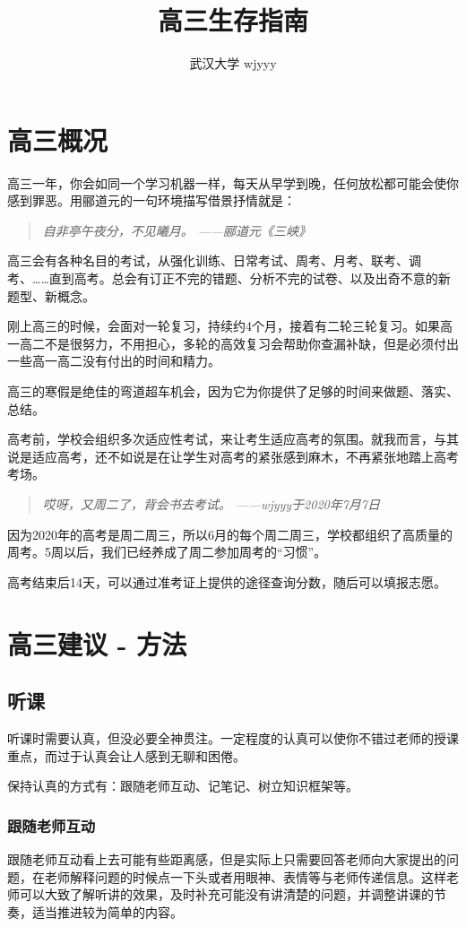 \documentclass[UTF8,11pt,a4paper]{ctexart}
\title{\textbf{高三生存指南}}
\author{武汉大学 wjyyy}
\begin{document}
	\maketitle
	\tableofcontents
	\section{高三概况}
		高三一年，你会如同一个学习机器一样，每天从早学到晚，任何放松都可能会使你感到罪恶。用郦道元的一句环境描写借景抒情就是：
		\begin{quote}
			\textit{自非亭午夜分，不见曦月。}
			\flushright\textit{——郦道元《三峡》}
		\end{quote}
		
		高三会有各种名目的考试，从强化训练、日常考试、周考、月考、联考、调考、……直到高考。总会有订正不完的错题、分析不完的试卷、以及出奇不意的新题型、新概念。
		
		刚上高三的时候，会面对一轮复习，持续约4个月，接着有二轮三轮复习。如果高一高二不是很努力，不用担心，多轮的高效复习会帮助你查漏补缺，但是必须付出一些高一高二没有付出的时间和精力。
		
		高三的寒假是绝佳的弯道超车机会，因为它为你提供了足够的时间来做题、落实、总结。
		
		高考前，学校会组织多次适应性考试，来让考生适应高考的氛围。就我而言，与其说是适应高考，还不如说是在让学生对高考的紧张感到麻木，不再紧张地踏上高考考场。
		
		\begin{quote}
			\textit{哎呀，又周二了，背会书去考试。}
			\flushright\textit{——wjyyy于2020年7月7日}
		\end{quote}
	
		因为2020年的高考是周二周三，所以6月的每个周二周三，学校都组织了高质量的周考。5周以后，我们已经养成了周二参加周考的“习惯”。
		
		高考结束后14天，可以通过准考证上提供的途径查询分数，随后可以填报志愿。
	\section{高三建议 - 方法}
		\subsection{听课}
			听课时需要认真，但没必要全神贯注。一定程度的认真可以使你不错过老师的授课重点，而过于认真会让人感到无聊和困倦。
			
			保持认真的方式有：跟随老师互动、记笔记、树立知识框架等。
			\subsubsection{跟随老师互动}
				跟随老师互动看上去可能有些距离感，但是实际上只需要回答老师向大家提出的问题，在老师解释问题的时候点一下头或者用眼神、表情等与老师传递信息。这样老师可以大致了解听讲的效果，及时补充可能没有讲清楚的问题，并调整讲课的节奏，适当推进较为简单的内容。
				
\end{document}
